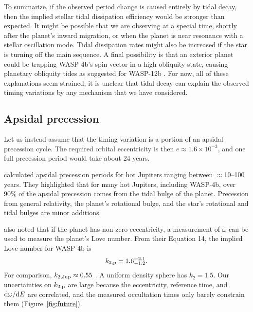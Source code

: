 \documentclass[12pt,twocolumn,tighten]{aastex62}
\begin{document}
To summarize, if the observed period change is caused entirely by
tidal decay, then the implied stellar tidal dissipation efficiency
would be stronger than expected.  It might be possible that we are
observing at a special time, shortly after the planet's inward
migration, or when the planet is near resonance with a stellar
oscillation mode.  Tidal dissipation rates might also be increased if
the star is turning off the main sequence.  A final possibility is
that an exterior planet could be trapping WASP-4b's spin vector in a
high-obliquity state, causing planetary obliquity tides as suggested
for WASP-12b \citep{millholland_obliquity_2018}.  For now, all of
these explanations seem strained; it is unclear that tidal decay can
explain the observed timing variations by any mechanism that we have
considered.


\subsection{Apsidal precession}
\label{sec:apsidal_precession}

Let us instead assume that the timing variation is a portion of an
apsidal precession cycle.  The required orbital eccentricity is then
$e\approx 1.6\times10^{-3}$, and one full precession period would take
about 24 years.

\citet{ragozzine_probing_2009} calculated apsidal precession periods
for hot Jupiters ranging between $\approx$10--100 years.  They
highlighted that for many hot Jupiters, including WASP-4b, over 90\%
of the apsidal precession comes from the tidal bulge of the planet.
Precession from general relativity, the planet's rotational bulge, and
the star's rotational and tidal bulges are minor additions.

\citet{ragozzine_probing_2009} also noted that if the planet has
non-zero eccentricity, a measurement of $\dot{\omega}$ can be used to
measure the planet's Love number.  From their Equation 14, the implied
Love number for WASP-4b is
\begin{equation}
k_{2,{\rm p}} = 1.6^{+2.1}_{-1.2}.
\end{equation}
For comparison, $k_{2,{\rm Jup}} \approx 0.55$
\citep{wahl_tidal_2016,ni_empirical_2018}.  A uniform density sphere
has $k_2 = 1.5$.  Our uncertainties on $k_{2,{\rm p}}$ are large
because the eccentricity, reference time, and ${\rm d}\omega/{\rm d}E$
are correlated, and the measured occultation times only barely
constrain them (Figure~\ref{fig:future}).
\end{document}
